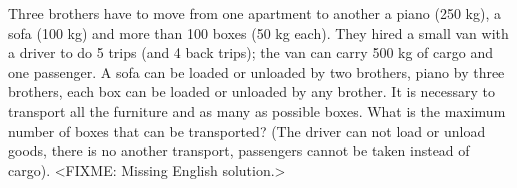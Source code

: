 \problem
Three brothers have to move from one apartment to another a piano
(250 kg), a sofa (100 kg) and more than 100 boxes (50 kg each).
They hired a small van with a driver to do 5 trips (and 4 back trips);
the van can carry 500 kg of cargo and one passenger.
A sofa can be loaded or unloaded by two brothers, piano by three brothers, each
box can be loaded or unloaded by any brother.
It is necessary to transport all the furniture and as many as possible boxes.
What is the maximum number of boxes that can be transported?
(The driver can not load or unload goods, there is no another transport,
passengers cannot be taken instead of cargo).
\solution
<FIXME: Missing English solution.>
\endproblem
